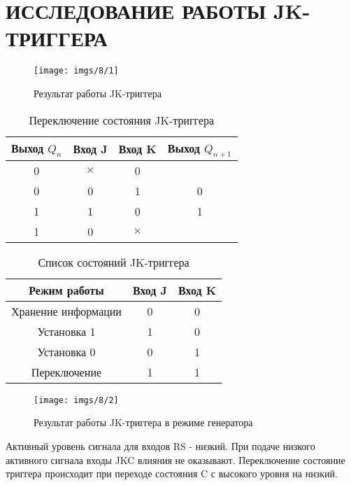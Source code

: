 \section{ИССЛЕДОВАНИЕ РАБОТЫ JK-ТРИГГЕРА}

\begin{figure}[H]
	\centering
	\texttt{[image: imgs/8/1]}
	\caption{Результат работы JK-триггера}
	\label{fig:8_1}
\end{figure}

\begin{table}[H]
	\centering
	\caption{Переключение состояния JK-триггера}
	\label{tab:lab_08_states}
	\begin{tabular}{|c|c|c|c|}
		\hline
		Выход $Q_n$ & Вход J   & Вход K   & Выход $Q_{n+1}$ \\ \hline
		0           & $\times$ & 0        &                 \\ \hline
		0           & 0        & 1        & 0               \\ \hline
		1           & 1        & 0        & 1               \\ \hline
		1           & 0        & $\times$ &                 \\ \hline
	\end{tabular}
\end{table}

\begin{table}[H]
	\centering
	\caption{Список состояний JK-триггера}
	\label{tab:lab_08_mode}
	\begin{tabular}{|c|c|c|}
		\hline
		Режим работы        & Вход J & Вход K \\ \hline
		Хранение информации & 0      & 0      \\ \hline
		Установка 1         & 1      & 0      \\ \hline
		Установка 0         & 0      & 1      \\ \hline
		Переключение        & 1      & 1      \\ \hline
	\end{tabular}
\end{table}

\begin{figure}[H]
	\centering
	\texttt{[image: imgs/8/2]}
	\caption{Результат работы JK-триггера в режиме генератора}
	\label{fig:8_2}
\end{figure}

Активный уровень сигнала для входов RS - низкий.
При подаче низкого активного сигнала входы JKC влияния не оказывают.
Переключение состояние триггера происходит при переходе состояния C с высокого уровня на низкий.

